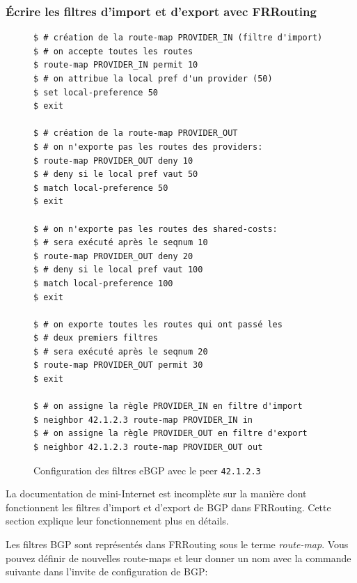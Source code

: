 \documentclass[a4paper, 11pt]{article}
\begin{document}
\subsubsection{Écrire les filtres d'import et d'export avec FRRouting}

\begin{figure}
    \begin{verbatim}
$ # création de la route-map PROVIDER_IN (filtre d'import)
$ # on accepte toutes les routes
$ route-map PROVIDER_IN permit 10
$ # on attribue la local pref d'un provider (50)
$ set local-preference 50
$ exit

$ # création de la route-map PROVIDER_OUT
$ # on n'exporte pas les routes des providers:
$ route-map PROVIDER_OUT deny 10
$ # deny si le local pref vaut 50
$ match local-preference 50
$ exit

$ # on n'exporte pas les routes des shared-costs:
$ # sera exécuté après le seqnum 10
$ route-map PROVIDER_OUT deny 20
$ # deny si le local pref vaut 100
$ match local-preference 100
$ exit

$ # on exporte toutes les routes qui ont passé les
$ # deux premiers filtres
$ # sera exécuté après le seqnum 20
$ route-map PROVIDER_OUT permit 30
$ exit

$ # on assigne la règle PROVIDER_IN en filtre d'import
$ neighbor 42.1.2.3 route-map PROVIDER_IN in
$ # on assigne la règle PROVIDER_OUT en filtre d'export
$ neighbor 42.1.2.3 route-map PROVIDER_OUT out
    \end{verbatim}
    \caption{Configuration des filtres eBGP avec le peer \texttt{42.1.2.3}}
    \label{fig:bgp-filters}
    \end{figure}
La documentation de mini-Internet est incomplète sur la manière dont fonctionnent
les filtres d'import et d'export de BGP dans FRRouting. Cette section
explique leur fonctionnement plus en détails.

Les filtres BGP sont représentés dans FRRouting sous le terme
\textit{route-map}. Vous pouvez définir de nouvelles route-maps
et leur donner un nom avec la commande suivante dans l'invite de
configuration de BGP:
\end{document}

